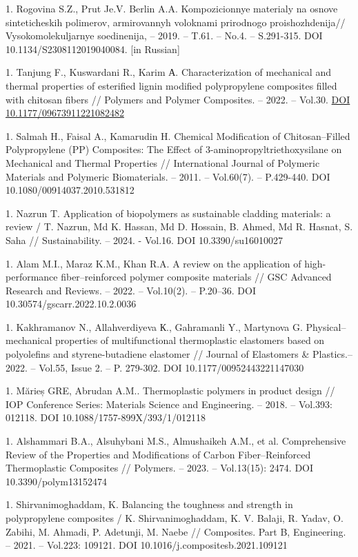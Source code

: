 1. Rogovina S.Z., Prut Je.V. Berlin A.A. Kompozicionnye materialy na
osnove sinteticheskih polimerov, armirovannyh voloknami prirodnogo
proishozhdenija// Vysokomolekuljarnye soedinenija, -- 2019. -- T.61.
-- No.4. -- S.291-315. DOI 10.1134/S2308112019040084. {[}in
Russian{]}

1. Tanjung F., Kuswardani R., Karim А. Characterization of mechanical and
thermal properties of esterified lignin modified polypropylene
composites filled with chitosan fibers // Polymers and Polymer
Composites. -- 2022. -- Vol.30.
\href{https://doi.org/10.1177/09673911221082482}{DOI
10.1177/09673911221082482}

1. Salmah H., Faisal A., Kamarudin H. Chemical Modification of
Chitosan--Filled Polypropylene (PP) Composites: The Effect of
3-aminopropyltriethoxysilane on Mechanical and Thermal Properties //
International Journal of Polymeric Materials and Polymeric
Biomaterials. -- 2011. -- Vol.60(7). -- P.429-440. DOI
10.1080/00914037.2010.531812

1. Nazrun T. Application of biopolymers as sustainable cladding
materials: a review / T. Nazrun, Md K. Hassan, Md D. Hossain, B.
Ahmed, Md R. Hasnat, S. Saha // Sustainability. -- 2024. - Vol.16.
DOI 10.3390/su16010027

1. Alam M.I., Maraz K.M., Khan R.A. A review on the application of
high-performance fiber--reinforced polymer composite materials // GSC
Advanced Research and Reviews. -- 2022. -- Vol.10(2). -- P.20--36.
DOI 10.30574/gscarr.2022.10.2.0036

1. Kakhramanov N., Allahverdiyeva К., Gahramanli Y., Martynova G.
Physical--mechanical properties of multifunctional thermoplastic
elastomers based on polyolefins and styrene-butadiene elastomer //
Journal of Elastomers \& Plastics.-- 2022. -- Vol.55, Issue 2. -- P.
279-302. DOI 10.1177/00952443221147030

1. Mărieș GRE, Abrudan A.M.. Thermoplastic polymers in product design //
IOP Conference Series: Materials Science and Engineering. -- 2018. --
Vol.393: 012118. DOI 10.1088/1757-899X/393/1/012118

1. Alshammari B.A., Alsuhybani M.S., Almushaikeh A.M., et al.
Comprehensive Review of the Properties and Modifications of Carbon
Fiber--Reinforced Thermoplastic Composites // Polymers. -- 2023. --
Vol.13(15): 2474. DOI 10.3390/polym13152474

1. Shirvanimoghaddam, K. Balancing the toughness and strength in
polypropylene composites / K. Shirvanimoghaddam, K. V. Balaji, R.
Yadav, O. Zabihi, M. Ahmadi, P. Adetunji, M. Naebe // Composites. Part
B, Engineering. -- 2021. -- Vol.223: 109121. DOI
10.1016/j.compositesb.2021.109121

